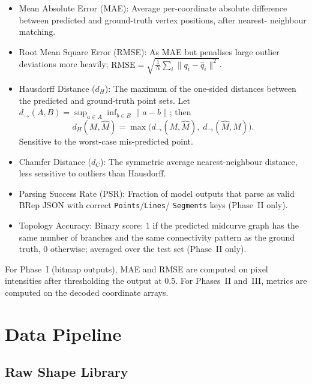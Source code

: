\documentclass[journal]{IEEEtran}
\begin{document}
\begin{itemize}
  \item Mean Absolute Error (MAE): Average per-coordinate absolute difference
        between predicted and ground-truth vertex positions, after nearest-
        neighbour matching.

  \item Root Mean Square Error (RMSE): As MAE but penalises large outlier
        deviations more heavily; $\text{RMSE} = \sqrt{\tfrac{1}{N}\sum_i
        \|q_i - \hat{q}_i\|^2}$.

  \item Hausdorff Distance ($d_H$): The maximum of the one-sided distances
        between the predicted and ground-truth point sets.
        Let $d_{\rightarrow}(A,B)=\sup_{a\in A}\inf_{b\in B}\|a-b\|$; then
        \[
          d_H(M,\hat{M}) = \max\bigl(d_{\rightarrow}(M,\hat{M}),\;
                                     d_{\rightarrow}(\hat{M},M)\bigr).
        \]
        Sensitive to the worst-case mis-predicted point.

  \item Chamfer Distance ($d_C$): The symmetric average nearest-neighbour
        distance, less sensitive to outliers than Hausdorff.

  \item Parsing Success Rate (PSR): Fraction of model outputs that parse as
        valid BRep JSON with correct \texttt{Points}/\texttt{Lines}/
        \texttt{Segments} keys (Phase~II only).

  \item Topology Accuracy: Binary score: 1 if the predicted midcurve graph
        has the same number of branches and the same connectivity pattern as
        the ground truth, 0 otherwise; averaged over the test set (Phase~II
        only).
\end{itemize}

For Phase~I (bitmap outputs), MAE and RMSE are computed on pixel intensities
after thresholding the output at 0.5.  For Phases~II and~III, metrics are
computed on the decoded coordinate arrays.

\section{Data Pipeline}
\label{sec:data}

\subsection{Raw Shape Library}
\end{document}
